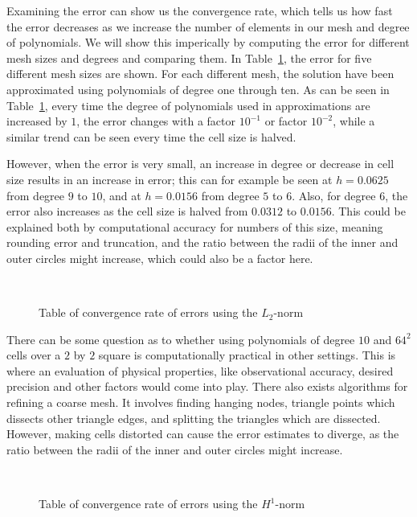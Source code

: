 Examining the error can show us the 
convergence rate, which tells us how fast the error decreases as we increase the number of elements in our mesh and degree of polynomials.
We will show this imperically by computing the error for different mesh sizes and degrees and comparing them. 
In Table~\ref{tab:convergence_l2}, 
the error for five different mesh sizes are shown. 
For each different mesh, the solution have been approximated using polynomials of degree one through ten.
As can be seen in Table~\ref{tab:convergence_l2}, every time the degree of polynomials used in 
approximations are increased by $1$, the error changes with a factor $10^{-1}$ or factor 
$10^{-2}$, while a similar trend can be seen every time the cell size is halved. 

However, when the error is very small, an increase in degree or decrease in cell size results in 
an increase in error; this can for example be seen at $h=0.0625$ from degree $9$ to $10$, and 
at $h=0.0156$ from degree $5$ to $6$. 
Also, for degree $6$, the error also increases as the cell size is halved from $0.0312$ to $0.0156$.
This could be explained both by computational accuracy for 
numbers of this size, meaning rounding error and truncation, and the ratio between the radii of the
inner and outer circles might increase, which could also be a factor here.
\begin{figure}[ht]
    \center~
    \caption{Table of convergence rate of errors using the $L_2$-norm}\label{tab:convergence_l2}
\end{figure}
There can be some question as to whether using polynomials of degree $10$ and $64^2$ cells over a 
$2$ by $2$ square is computationally practical in other settings. 
This is where an evaluation of physical properties, like observational accuracy, desired precision and other 
factors would come into play.
There also exists algorithms for refining a coarse mesh. It involves finding hanging nodes, triangle 
points which dissects other triangle edges, and splitting the triangles which are dissected. 
However, making cells distorted can cause the error estimates to diverge, as the ratio between the radii of the
inner and outer circles might increase.
\begin{figure}[ht]
    \center~
    \caption{Table of convergence rate of errors using the $H^1$-norm}
    \label{tab:convergence_H1}
\end{figure}
